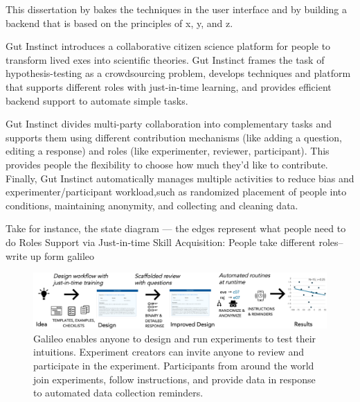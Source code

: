 This dissertation by bakes the techniques in the user interface  and by building a backend that is based on the principles of x, y, and z.

Gut Instinct  introduces a collaborative citizen science platform for people to transform lived exes into scientific theories. Gut Instinct frames the task of hypothesis-testing as a crowdsourcing problem, develops techniques and platform that supports different roles with just-in-time learning, and provides efficient backend support to automate simple tasks.

Gut Instinct divides multi-party collaboration into complementary tasks and supports them using different contribution mechanisms (like adding a question, editing a response) and roles (like experimenter, reviewer, participant). This provides people the flexibility to choose how much they’d like to contribute. Finally, Gut Instinct automatically manages multiple activities to reduce 
bias and experimenter/participant workload,such as randomized placement of 
people into conditions, maintaining anonymity, and collecting and cleaning data.


Take for instance, the state diagram — the edges represent what people need to do 
Roles Support via Just-in-time Skill Acquisition:  People take different roles--write up form galileo


\begin{figure}[h] 
  \centering
  \includegraphics[width=1.0\textwidth]{figures/galileo/galileo-1}
  \caption[]
{Galileo enables anyone to design and run experiments to test their intuitions. Experiment creators can invite anyone to review and participate in the experiment. Participants from around the world join experiments, follow instructions, and provide data in response to automated data collection reminders.}
  \label{fig:galileo-1}
\end{figure}


